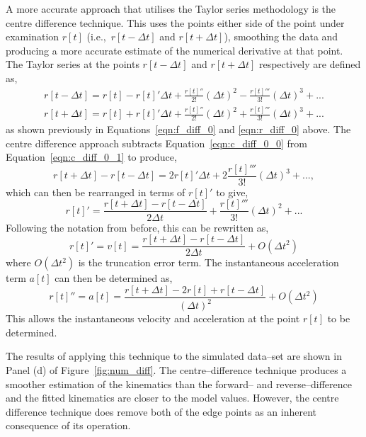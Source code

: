 A more accurate approach that utilises the Taylor series methodology is the centre difference technique. This uses the points either side of the point under examination $r[t]$ (i.e.,\ $r[t - \Delta t]$ and $r[t + \Delta t]$), smoothing the data and producing a more accurate estimate of the numerical derivative at that point. The Taylor series at the points $r[t - \Delta t]$ and $r[t + \Delta t]$ respectively are defined as,
\begin{align}
r[t - \Delta t] = r[t] - r[t]'\Delta t +  \frac{r[t]''}{2!}(\Delta t)^{2} - \frac{r[t]'''}{3!}(\Delta t)^{3}  + ... \label{eqn:c_diff_0_0} \\
r[t + \Delta t] = r[t] + r[t]'\Delta t +  \frac{r[t]''}{2!}(\Delta t)^{2} + \frac{r[t]'''}{3!}(\Delta t)^{3}  + ... \label{eqn:c_diff_0_1}
\end{align}
as shown previously in Equations~\ref{eqn:f_diff_0} and \ref{eqn:r_diff_0} above. The centre difference approach subtracts Equation~\ref{eqn:c_diff_0_0} from Equation~\ref{eqn:c_diff_0_1} to produce,
\begin{equation}
r[t + \Delta t] - r[t - \Delta t] = 2 r[t]'\Delta t +  2 \frac{r[t]'''}{3!}(\Delta t)^{3}  + ... ,
\end{equation}
which can then be rearranged in terms of $r[t]'$ to give,
\begin{equation}
r[t]' = \frac{r[t + \Delta t]- r[t - \Delta t]}{2\Delta t} +  \frac{r[t]'''}{3!}(\Delta t)^{2}  + ... 
\end{equation}
Following the notation from before, this can be rewritten as,
\begin{equation}
r[t]' = v[t] = \frac{r[t + \Delta t] - r[t - \Delta t]}{2\Delta t} + O(\Delta t^{2})
\end{equation}
where $O(\Delta t^{2})$ is the truncation error term. The instantaneous acceleration term $a[t]$ can then be determined as,
\begin{equation}
r[t]'' = a[t] = \frac{r[t + \Delta t] - 2r[t] + r[t - \Delta t]}{(\Delta t)^2} + O(\Delta t^{2})
\end{equation}
This allows the instantaneous velocity and acceleration at the point $r[t]$ to be determined. 

The results of applying this technique to the simulated data--set are shown in Panel (d) of Figure~\ref{fig:num_diff}. The centre--difference technique produces a smoother estimation of the kinematics than the forward-- and reverse--difference and the fitted kinematics are closer to the model values. However, the centre difference technique does remove both of the edge points as an inherent consequence of its operation. 

